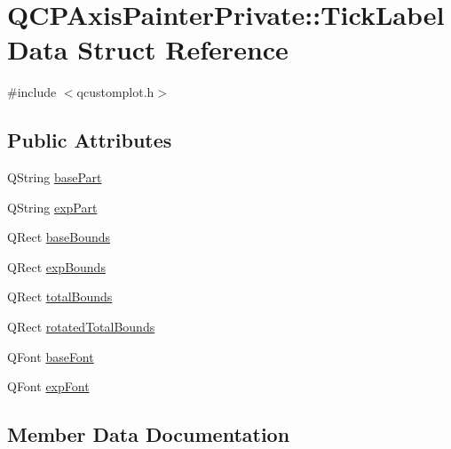 \hypertarget{struct_q_c_p_axis_painter_private_1_1_tick_label_data}{}\section{Q\+C\+P\+Axis\+Painter\+Private\+:\+:Tick\+Label\+Data Struct Reference}
\label{struct_q_c_p_axis_painter_private_1_1_tick_label_data}


{\ttfamily \#include $<$qcustomplot.\+h$>$}

\subsection*{Public Attributes}
\begin{DoxyCompactItemize}
\item 
Q\+String \hyperlink{struct_q_c_p_axis_painter_private_1_1_tick_label_data_ad65b76a5cafc412179a20b5d79809fc4}{base\+Part}
\item 
Q\+String \hyperlink{struct_q_c_p_axis_painter_private_1_1_tick_label_data_a09692e4ea092137278b4ac051d5fdf2b}{exp\+Part}
\item 
Q\+Rect \hyperlink{struct_q_c_p_axis_painter_private_1_1_tick_label_data_aac1047ae6ab8e9f5a42923082aabfff5}{base\+Bounds}
\item 
Q\+Rect \hyperlink{struct_q_c_p_axis_painter_private_1_1_tick_label_data_a6722d2bcefb93011e9dc42301b966846}{exp\+Bounds}
\item 
Q\+Rect \hyperlink{struct_q_c_p_axis_painter_private_1_1_tick_label_data_afbb3163cf4c628914f1b703945419ea5}{total\+Bounds}
\item 
Q\+Rect \hyperlink{struct_q_c_p_axis_painter_private_1_1_tick_label_data_aa4d38c5ea47c9184a78ee33ae7f1012e}{rotated\+Total\+Bounds}
\item 
Q\+Font \hyperlink{struct_q_c_p_axis_painter_private_1_1_tick_label_data_a0d4958a706debaa8d19a9b65fc090d56}{base\+Font}
\item 
Q\+Font \hyperlink{struct_q_c_p_axis_painter_private_1_1_tick_label_data_adc10767ebcb719d6927c012a38b9d933}{exp\+Font}
\end{DoxyCompactItemize}


\subsection{Member Data Documentation}
\hypertarget{struct_q_c_p_axis_painter_private_1_1_tick_label_data_aac1047ae6ab8e9f5a42923082aabfff5}{}

